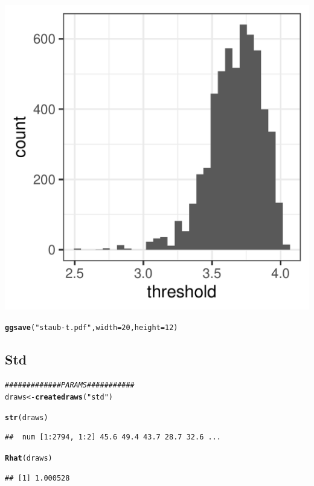 \documentclass{article}\usepackage[]{graphicx}\usepackage[]{color}
\makeatletter
\def\maxwidth{ %
  \ifdim\Gin@nat@width>\linewidth
    \linewidth
  \else
    \Gin@nat@width
  \fi
}
\newcommand{\hlnum}[1]{\textcolor[rgb]{0.686,0.059,0.569}{#1}}%
\newcommand{\hlstr}[1]{\textcolor[rgb]{0.192,0.494,0.8}{#1}}%
\newcommand{\hlcom}[1]{\textcolor[rgb]{0.678,0.584,0.686}{\textit{#1}}}%
\newcommand{\hlstd}[1]{\textcolor[rgb]{0.345,0.345,0.345}{#1}}%
\newcommand{\hlkwb}[1]{\textcolor[rgb]{0.69,0.353,0.396}{#1}}%
\newcommand{\hlkwc}[1]{\textcolor[rgb]{0.333,0.667,0.333}{#1}}%
\newcommand{\hlkwd}[1]{\textcolor[rgb]{0.737,0.353,0.396}{\textbf{#1}}}%
\newenvironment{kframe}{%
 \def\at@end@of@kframe{}%
 \ifinner\ifhmode%
  \def\at@end@of@kframe{\end{minipage}}%
  \begin{minipage}{\columnwidth}%
 \fi\fi%
 \def\FrameCommand##1{\hskip\@totalleftmargin \hskip-\fboxsep
 \colorbox{shadecolor}{##1}\hskip-\fboxsep
     \hskip-\linewidth \hskip-\@totalleftmargin \hskip\columnwidth}%
 \MakeFramed {\advance\hsize-\width
   \@totalleftmargin\z@ \linewidth\hsize
   \@setminipage}}%
 {\par\unskip\endMakeFramed%
 \at@end@of@kframe}
\newenvironment{knitrout}{}{} %
\makeatother
\begin{document}
\begin{knitrout}
\begin{kframe}
{\ttfamily\noindent\itshape\color{messagecolor}{\#\# `stat\_bin()` using `bins = 30`. Pick better value with `binwidth`.}}\end{kframe}
\includegraphics[width=\maxwidth]{figures/figure_staub_exp3unnamed-chunk-26-1} 
\begin{kframe}\begin{alltt}
\hlkwd{ggsave}\hlstd{(}\hlstr{"staub-t.pdf"}\hlstd{,} \hlkwc{width} \hlstd{=} \hlnum{20}\hlstd{,} \hlkwc{height} \hlstd{=} \hlnum{12}\hlstd{)}
\end{alltt}


{\ttfamily\noindent\itshape\color{messagecolor}{\#\# `stat\_bin()` using `bins = 30`. Pick better value with `binwidth`.}}\end{kframe}
\end{knitrout}

\subsection{Std}

\begin{knitrout}
\color{fgcolor}\begin{kframe}
\begin{alltt}
\hlcom{############# PARAMS###########}
\hlstd{draws} \hlkwb{<-} \hlkwd{createdraws}\hlstd{(}\hlstr{"std"}\hlstd{)}

\hlkwd{str}\hlstd{(draws)}
\end{alltt}
\begin{verbatim}
##  num [1:2794, 1:2] 45.6 49.4 43.7 28.7 32.6 ...
\end{verbatim}
\begin{alltt}
\hlkwd{Rhat}\hlstd{(draws)}
\end{alltt}
\begin{verbatim}
## [1] 1.000528
\end{verbatim}
\end{kframe}
\end{knitrout}
\end{document}
